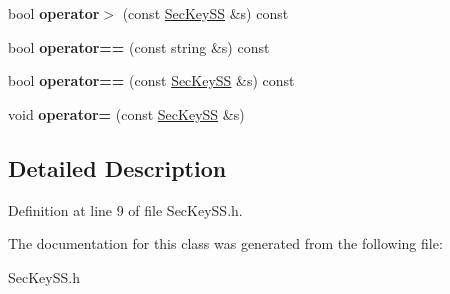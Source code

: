 \begin{DoxyCompactItemize}
bool {\bfseries operator$>$} (const \hyperlink{classSecKeySS}{Sec\+Key\+SS} \&s) const
\item 
\mbox{\label{classSecKeySS_ac7ac8ff28deb97fe49c993a5e70c55c2}} 
bool {\bfseries operator==} (const string \&s) const
\item 
\mbox{\label{classSecKeySS_ae0dd65edcf924c2ba31d713d43451937}} 
bool {\bfseries operator==} (const \hyperlink{classSecKeySS}{Sec\+Key\+SS} \&s) const
\item 
\mbox{\label{classSecKeySS_a3f4dd72a65e6485556389f44b6739d73}} 
void {\bfseries operator=} (const \hyperlink{classSecKeySS}{Sec\+Key\+SS} \&s)
\end{DoxyCompactItemize}


\subsection{Detailed Description}


Definition at line 9 of file Sec\+Key\+S\+S.\+h.



The documentation for this class was generated from the following file\+:\begin{DoxyCompactItemize}
\item 
Sec\+Key\+S\+S.\+h\end{DoxyCompactItemize}

